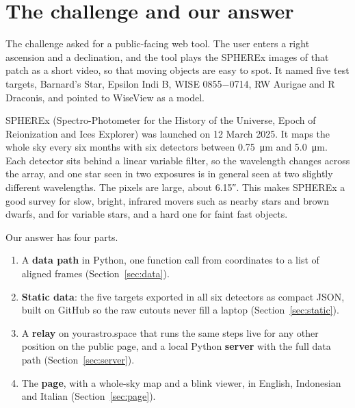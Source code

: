 \documentclass[11pt,a4paper]{article}
\begin{document}
\tableofcontents
\newpage

\section{The challenge and our answer}

The challenge asked for a public-facing web tool. The user enters a right ascension and a
declination, and the tool plays the SPHEREx images of that patch as a short video, so that
moving objects are easy to spot. It named five test targets, Barnard's Star, Epsilon Indi B,
WISE 0855$-$0714, RW Aurigae and R Draconis, and pointed to WiseView as a model.

SPHEREx (Spectro-Photometer for the History of the Universe, Epoch of Reionization and Ices
Explorer) was launched on 12 March 2025. It maps the whole sky every six months with six
detectors between \SI{0.75}{\micro\metre} and \SI{5.0}{\micro\metre}. Each detector sits
behind a linear variable filter, so the wavelength changes across the array, and one star
seen in two exposures is in general seen at two slightly different wavelengths. The pixels
are large, about \ang{;;6.15}. This makes SPHEREx a good survey for slow, bright, infrared
movers such as nearby stars and brown dwarfs, and for variable stars, and a hard one for faint
fast objects.

Our answer has four parts.
\begin{enumerate}
  \item A \textbf{data path} in Python, one function call from coordinates to a list of
        aligned frames (Section~\ref{sec:data}).
  \item \textbf{Static data}: the five targets exported in all six detectors as compact JSON,
        built on GitHub so the raw cutouts never fill a laptop (Section~\ref{sec:static}).
  \item A \textbf{relay} on yourastro.space that runs the same steps live for any other
        position on the public page, and a local Python \textbf{server} with the full data path
        (Section~\ref{sec:server}).
  \item The \textbf{page}, with a whole-sky map and a blink viewer, in English, Indonesian and
        Italian (Section~\ref{sec:page}).
\end{enumerate}
\end{document}
